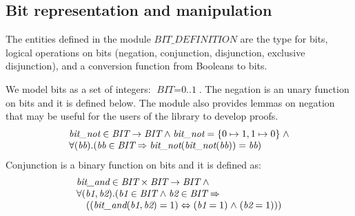 \documentclass[a4paper]{llncs}
\begin{document}
\subsection{Bit representation and manipulation}
\label{subsec:HardwareLibrary1}

The entities defined in the module $\textit{BIT\_DEFINITION}$ are the
type for bits, logical operations on bits (negation, conjunction,
disjunction, exclusive disjunction), and a conversion function from
Booleans to bits.

We model bits as a set of integers: $\textit{BIT} =
\textit{0..1}$. The negation is an unary function on bits and it is
defined below. The module also provides lemmas on negation that may be useful for the
users of the library to develop proofs.
$$
\begin{array}{l}
\textit{bit\_not}  \in  \textit{BIT}  \fun  \textit{BIT}  \land 
\textit{bit\_not} \rm = \rm \{ \rm 0  \mapsto  \rm 1 , \rm 1  \mapsto  \rm 0 \rm \} \land \\
\forall (\textit{bb}).(\textit{bb} \in \textit{BIT} \implies \textit{bit\_not}(\textit{bit\_not}(\textit{bb})) = \textit{bb})
\end{array}
$$
Conjunction is a binary function on bits and it is defined as:
$$
\begin{array}{l}
\textit{bit\_and} \in \textit{BIT} \times \textit{BIT} \fun \textit{BIT} \land \\
\forall (\textit{b1}, \textit{b2}).(\textit{b1}  \in \textit{BIT}  \land \textit{b2} \in \textit{BIT} \implies \\
\quad ((\textit{bit\_and}(\textit{b1}, \textit{b2}) = 1) \iff (\textit{b1} = 1)  \land  (\textit{b2} = 1)))
\end{array}
$$
\end{document}
